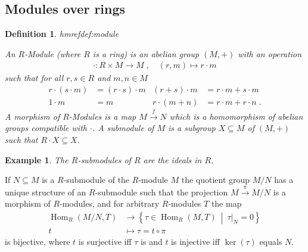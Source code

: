 \documentclass[DIV=14,parskip=full,pointednumbers]{scrartcl}
\theoremstyle{cthm}
\theoremstyle{cvarthm}
\theoremstyle{cdef}
\newtheorem{defi}{Definition}[subsection]
\newtheorem{example}{Example}[subsection]
\newcommand{\lbl}[1]{
	\label{#1}
	\edef\dummy{\curthm}
	\expandafter\xdef\csname thmref#1\endcsname{\dummy}
}
\newcommand{\Hom}{\operatorname{Hom}}
\newcommand{\longto}{\longrightarrow}
\newcommand{\st}{\ \middle|\ }
\begin{document}
\subsection{Modules over rings}
\begin{defi}\lbl{def:module}
 An $R$-Module (where $R$ is a ring) is an abelian group $(M,+)$ with an operation
 \begin{align*}
  \cdot: R\times M \longto M\;,\quad  (r,m) \longmapsto r\cdot m
 \end{align*}
 such that for all $r,s\in R$ and $m,n\in M$
 \begin{align*}
  r\cdot(s\cdot m) &= (r\cdot s)\cdot m & (r+s)\cdot m &= r\cdot m + s\cdot m\\
  1\cdot m &= m & r\cdot(m+n)&= r\cdot m +r\cdot n\;. 
 \end{align*}
A \emph{morphism} of $R$-Modules is a map $M \overset{f}{\longto} N$ which is a homomorphism of abelian groups compatible with $\cdot$.
A \emph{submodule} of $M$ is a subgroup $X\subseteq M$ of $(M,+)$ such that $R\cdot X \subseteq X$. 
\end{defi}
\begin{example} The $R$-submodules of $R$ are the ideals in $R$.
\end{example}
\begin{prop} If $N\subseteq M$ is a $R$-submodule of the $R$-module $M$ the quotient group $M/N$ has a unique structure of an $R$-submodule such that the projection $M\overset{\pi}{\longto} M/N$ is a morphism of $R$-modules, and for arbitrary $R$-modules $T$ the map  
\begin{align*}
 \Hom_R(M/N, T) &\longto \left\{\tau\in \Hom_R(M,T)\st \tau|_N = 0\right\}\\
 t &\longmapsto \tau = t \circ \pi
\end{align*}
is bijective, where $t$ is surjective iff $\tau$ is and $t$ is injective iff $\ker(\tau)$ equals $N$.
\end{prop}
\end{document}
